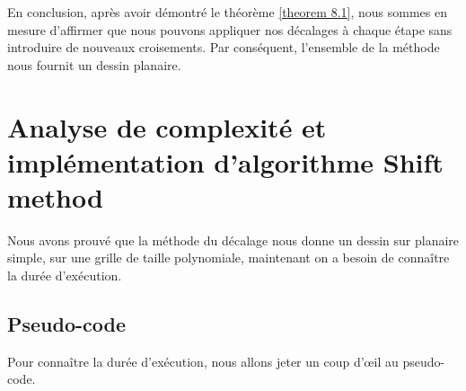 \documentclass[hidelinks,letterpaper,12pt]{article}
\begin{document}
En conclusion, après avoir démontré le théorème \ref{theorem 8.1}, nous sommes en mesure d'affirmer que nous pouvons appliquer nos décalages à chaque étape sans introduire de nouveaux croisements. Par conséquent, l'ensemble de la méthode nous fournit un dessin planaire.







\newpage
\section{Analyse de complexité et implémentation d'algorithme Shift method}
\label{Analyse de complexité et implémentation d'algorithme Shift method}
Nous avons prouvé que la méthode du décalage nous donne un dessin sur planaire simple, sur une grille de taille polynomiale, maintenant on a besoin de connaître la durée d'exécution.

\subsection{Pseudo-code}
\label{Pseudo-code}
Pour connaître la durée d'exécution, nous allons jeter un coup d'œil au pseudo-code.
\\ \\
\end{document}
